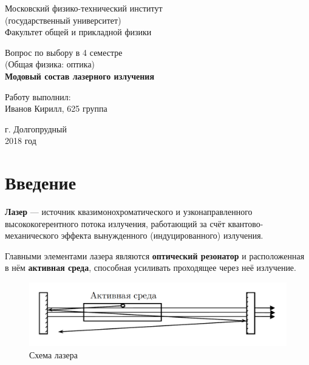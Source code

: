 \documentclass[12pt]{kiarticle}
\begin{document}
	
	\begin{titlepage}
	\begin{center}
		\large 	Московский физико-технический институт \\
		(государственный университет) \\
		Факультет общей и прикладной физики \\
		\vspace{0.2cm}
		
		\vspace{4.5cm}
		\Large{Вопрос по выбору в 4 семестре \\ \vspace{0.2cm}
			(Общая физика: оптика)} \\ \vspace{0.2cm}
		\LARGE \textbf{Модовый состав лазерного излучения}
	\end{center}
	\vspace{2.3cm} \large
	
	\begin{center}
		Работу выполнил: \\
		Иванов Кирилл,
		625 группа
		\vspace{10mm}		
		
	\end{center}
	
	\begin{center} \vspace{60mm}
		г. Долгопрудный \\
		2018 год
	\end{center}
\end{titlepage}



\section{Введение}

\textbf{Лазер} ---  источник квазимонохроматического и узконаправленного высококогерентного потока излучения, работающий за счёт квантово-механического эффекта вынужденного (индуцированного) излучения.

Главными элементами лазера являются \textbf{оптический резонатор} и расположенная в нём \textbf{активная среда}, способная усиливать проходящее через неё излучение.

\begin{figure}[h!]
	\centering
	\includegraphics[width=0.7\linewidth]{laser.png}
	\caption{Схема лазера}
	\label{laser}
\end{figure}
\end{document}
